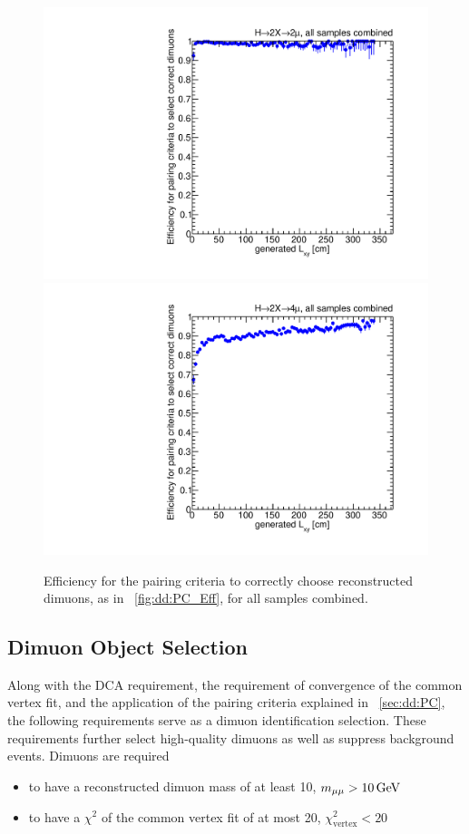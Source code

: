 \begin{figure}[p]
  \centering
  \includegraphics[width=\DSquareWidth]{figures/displaced/PC_Lxy_2Mu2J_Global.pdf}
  \hspace*{-2em}
  \includegraphics[width=\DSquareWidth]{figures/displaced/PC_Lxy_4Mu_Global.pdf}
  \caption{Efficiency for the pairing criteria to correctly choose reconstructed dimuons, as in \Fig~\ref{fig:dd:PC_Eff}, for all samples combined.}
  \label{fig:dd:PC_Eff_Global}
\end{figure}

\subsection{Dimuon Object Selection}
\label{sec:dd:DimuonObject}
Along with the DCA requirement, the requirement of convergence of the common vertex fit, and the application of the pairing criteria explained in \Sec~\ref{sec:dd:PC}, the following requirements serve as a dimuon identification selection.
These requirements further select high-quality dimuons as well as suppress background events.
Dimuons are required
\begin{itemize}
  \item to have a reconstructed dimuon mass of at least 10\GeV, \ie $m_{\mathrm{\mu}\mathrm{\mu}} > 10\,\text{Ge\hspace{-.08em}V}$
  \item to have a $\chi^2$ of the common vertex fit of at most 20, \ie $\chi^2_\text{vertex} < 20$
\end{itemize}

